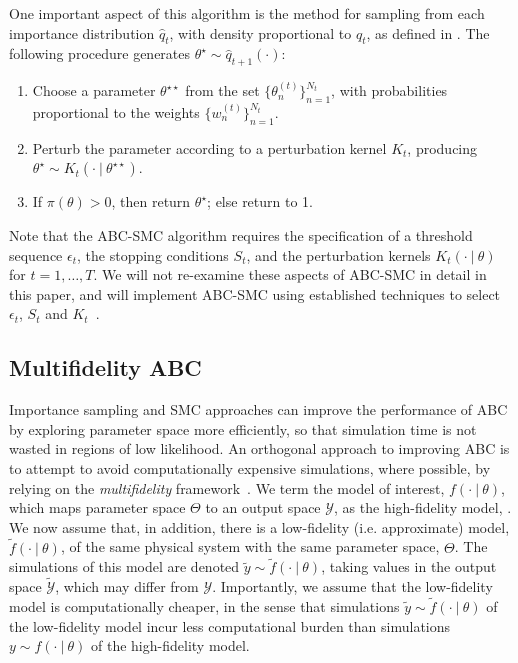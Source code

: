 \documentclass[12pt, onecolumn]{article}
\begin{document}
One important aspect of this algorithm is the method for sampling from each importance distribution $\hat q_t$, with density proportional to $q_t$, as defined in .
The following procedure generates $\theta^\star \sim \hat q_{t+1}(\cdot)$:
\begin{enumerate}
\item Choose a parameter $\theta^{\star\star}$ from the set $\{ \theta_n^{(t)} \}_{n=1}^{N_t}$, with probabilities proportional to the weights $\{ w_n^{(t)} \}_{n=1}^{N_t}$.
\item Perturb the parameter according to a perturbation kernel $K_t$, producing $\theta^{\star} \sim K_{t}(\cdot~|~\theta^{\star\star})$.
\item If $\pi(\theta)>0$, then return $\theta^{\star}$; else return to 1.
\end{enumerate}
Note that the ABC-SMC algorithm requires the specification of a threshold sequence $\epsilon_t$, the stopping conditions $S_t$, and the perturbation kernels $K_t(\cdot~|~\theta)$ for $t=1,\dots,T$.
We will not re-examine these aspects of ABC-SMC in detail in this paper, and will implement ABC-SMC using established techniques to select $\epsilon_t$, $S_t$ and $K_t$~\cite{Toni2009,DelMoral2012,Beaumont2009,Filippi2013}.

\subsection{Multifidelity ABC}
\label{s:MFABC}
Importance sampling and SMC approaches can improve the performance of ABC by exploring parameter space more efficiently, so that simulation time is not wasted in regions of low likelihood.
An orthogonal approach to improving ABC is to attempt to avoid computationally expensive simulations, where possible, by relying on the \emph{multifidelity} framework~\cite{Prescott2020}.
We term the model of interest, $f(\cdot~|~\theta)$, which maps parameter space $\Theta$ to an output space $\mathcal Y$, as the high-fidelity model, .
We now assume that, in addition, there is a low-fidelity (i.e. approximate) model, $\tilde f(\cdot~|~\theta)$, of the same physical system with the same parameter space, $\Theta$.
The simulations of this model are denoted $\tilde y \sim \tilde f(\cdot~|~\theta)$, taking values in the output space $\tilde{\mathcal Y}$, which may differ from $\mathcal Y$.
Importantly, we assume that the low-fidelity model is computationally cheaper, in the sense that simulations $\tilde y \sim \tilde f(\cdot~|~\theta)$ of the low-fidelity model incur less computational burden than simulations $y \sim f(\cdot~|~\theta)$ of the high-fidelity model.
\end{document}
